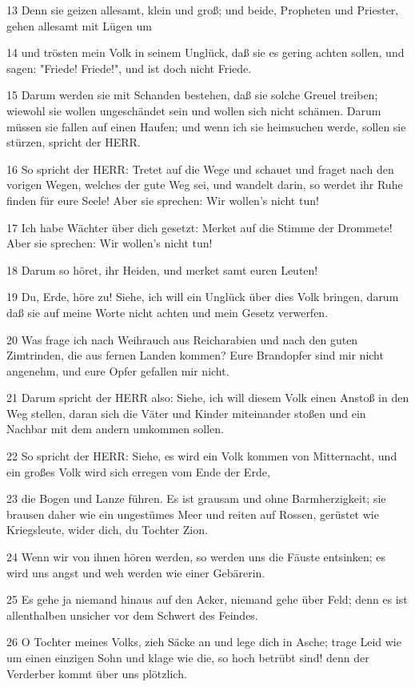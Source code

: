 \par 13 Denn sie geizen allesamt, klein und groß; und beide, Propheten und Priester, gehen allesamt mit Lügen um
\par 14 und trösten mein Volk in seinem Unglück, daß sie es gering achten sollen, und sagen: "Friede! Friede!", und ist doch nicht Friede.
\par 15 Darum werden sie mit Schanden bestehen, daß sie solche Greuel treiben; wiewohl sie wollen ungeschändet sein und wollen sich nicht schämen. Darum müssen sie fallen auf einen Haufen; und wenn ich sie heimsuchen werde, sollen sie stürzen, spricht der HERR.
\par 16 So spricht der HERR: Tretet auf die Wege und schauet und fraget nach den vorigen Wegen, welches der gute Weg sei, und wandelt darin, so werdet ihr Ruhe finden für eure Seele! Aber sie sprechen: Wir wollen's nicht tun!
\par 17 Ich habe Wächter über dich gesetzt: Merket auf die Stimme der Drommete! Aber sie sprechen: Wir wollen's nicht tun!
\par 18 Darum so höret, ihr Heiden, und merket samt euren Leuten!
\par 19 Du, Erde, höre zu! Siehe, ich will ein Unglück über dies Volk bringen, darum daß sie auf meine Worte nicht achten und mein Gesetz verwerfen.
\par 20 Was frage ich nach Weihrauch aus Reicharabien und nach den guten Zimtrinden, die aus fernen Landen kommen? Eure Brandopfer sind mir nicht angenehm, und eure Opfer gefallen mir nicht.
\par 21 Darum spricht der HERR also: Siehe, ich will diesem Volk einen Anstoß in den Weg stellen, daran sich die Väter und Kinder miteinander stoßen und ein Nachbar mit dem andern umkommen sollen.
\par 22 So spricht der HERR: Siehe, es wird ein Volk kommen von Mitternacht, und ein großes Volk wird sich erregen vom Ende der Erde,
\par 23 die Bogen und Lanze führen. Es ist grausam und ohne Barmherzigkeit; sie brausen daher wie ein ungestümes Meer und reiten auf Rossen, gerüstet wie Kriegsleute, wider dich, du Tochter Zion.
\par 24 Wenn wir von ihnen hören werden, so werden uns die Fäuste entsinken; es wird uns angst und weh werden wie einer Gebärerin.
\par 25 Es gehe ja niemand hinaus auf den Acker, niemand gehe über Feld; denn es ist allenthalben unsicher vor dem Schwert des Feindes.
\par 26 O Tochter meines Volks, zieh Säcke an und lege dich in Asche; trage Leid wie um einen einzigen Sohn und klage wie die, so hoch betrübt sind! denn der Verderber kommt über uns plötzlich.
